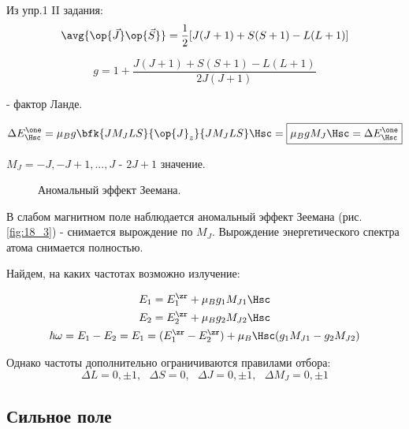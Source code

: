 Из упр.1 II задания:
$$
\avg{\op{\vec{J}} \op{\vec{S}}} = \frac{1}{2}[J(J+1) + S(S+1) - L(L + 1)]
$$

\begin{equation}
\label{eq:18_6_3}
\boxed{g = 1 + \frac{J(J+1) + S(S + 1) - L(L + 1)}{2J(J+1)}}
\end{equation}

- фактор Ланде.

\begin{equation}
\label{eq:18_6_4}
\Delta E_{\Hsc}^\one = \mu_B g \bfk{J M_J L S}{\op{J}_z}{J M_J L S} \Hsc = \boxed{\mu_B g M_J \Hsc = \Delta E_{\Hsc}^\one}
\end{equation}

$M_J = -J, -J + 1, ..., J$ - $2J+1$ значение.

\begin{figure}[h!]
\centering
{}
\caption{Аномальный эффект Зеемана.} \label{fig:18_3}
\end{figure}

В слабом магнитном поле наблюдается аномальный эффект Зеемана (рис. \eqref{fig:18_3}) - снимается вырождение по $M_J$. Вырождение энергетического спектра атома снимается полностью.

Найдем, на каких частотах возможно излучение:

\begin{gather}
\label{eq:18_6_5}
E_1 = E_1^\zr + \mu_B g_1 M_{J1} \Hsc \nonumber \\
E_2 = E_2^\zr + \mu_B g_2 M_{J2} \Hsc \nonumber \\
\hbar \omega = E_1 - E_2 = E_1 = (E_1^\zr -E_2^\zr)  + \mu_B \Hsc (g_1 M_{J1}  - g_2 M_{J2})
\end{gather}

Однако частоты дополнительно ограничиваются правилами отбора:
$$
\boxed{\Delta L = 0, \pm 1,~~~ \Delta S = 0, ~~~\Delta J = 0, \pm 1, ~~~ \Delta M_J = 0, \pm 1 }
$$

\subsection{Сильное поле}

